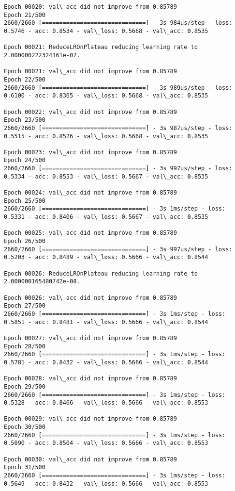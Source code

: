 \documentclass[11pt]{article}
\begin{document}
\begin{Verbatim}[commandchars=\\\{\}]
Epoch 00020: val\_acc did not improve from 0.85789
Epoch 21/500
2660/2660 [==============================] - 3s 984us/step - loss: 0.5746 - acc: 0.8534 - val\_loss: 0.5668 - val\_acc: 0.8535

Epoch 00021: ReduceLROnPlateau reducing learning rate to 2.000000222324161e-07.

Epoch 00021: val\_acc did not improve from 0.85789
Epoch 22/500
2660/2660 [==============================] - 3s 989us/step - loss: 0.6100 - acc: 0.8365 - val\_loss: 0.5668 - val\_acc: 0.8535

Epoch 00022: val\_acc did not improve from 0.85789
Epoch 23/500
2660/2660 [==============================] - 3s 987us/step - loss: 0.5515 - acc: 0.8526 - val\_loss: 0.5668 - val\_acc: 0.8535

Epoch 00023: val\_acc did not improve from 0.85789
Epoch 24/500
2660/2660 [==============================] - 3s 997us/step - loss: 0.5334 - acc: 0.8553 - val\_loss: 0.5667 - val\_acc: 0.8535

Epoch 00024: val\_acc did not improve from 0.85789
Epoch 25/500
2660/2660 [==============================] - 3s 1ms/step - loss: 0.5331 - acc: 0.8406 - val\_loss: 0.5667 - val\_acc: 0.8535

Epoch 00025: val\_acc did not improve from 0.85789
Epoch 26/500
2660/2660 [==============================] - 3s 997us/step - loss: 0.5203 - acc: 0.8489 - val\_loss: 0.5666 - val\_acc: 0.8544

Epoch 00026: ReduceLROnPlateau reducing learning rate to 2.000000165480742e-08.

Epoch 00026: val\_acc did not improve from 0.85789
Epoch 27/500
2660/2660 [==============================] - 3s 1ms/step - loss: 0.5851 - acc: 0.8481 - val\_loss: 0.5666 - val\_acc: 0.8544

Epoch 00027: val\_acc did not improve from 0.85789
Epoch 28/500
2660/2660 [==============================] - 3s 1ms/step - loss: 0.5781 - acc: 0.8432 - val\_loss: 0.5666 - val\_acc: 0.8544

Epoch 00028: val\_acc did not improve from 0.85789
Epoch 29/500
2660/2660 [==============================] - 3s 1ms/step - loss: 0.5328 - acc: 0.8466 - val\_loss: 0.5666 - val\_acc: 0.8553

Epoch 00029: val\_acc did not improve from 0.85789
Epoch 30/500
2660/2660 [==============================] - 3s 1ms/step - loss: 0.5090 - acc: 0.8504 - val\_loss: 0.5666 - val\_acc: 0.8553

Epoch 00030: val\_acc did not improve from 0.85789
Epoch 31/500
2660/2660 [==============================] - 3s 1ms/step - loss: 0.5649 - acc: 0.8432 - val\_loss: 0.5666 - val\_acc: 0.8553


\end{Verbatim}
\end{document}
